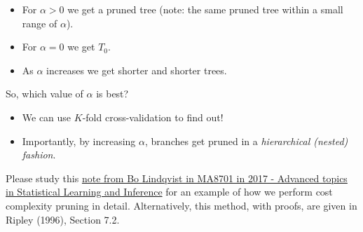 \documentclass[10pt,ignorenonframetext,]{beamer}
\begin{document}
\begin{frame}

\begin{itemize}
\item
  For \(\alpha>0\) we get a pruned tree (note: the same pruned tree
  within a small range of \(\alpha\)).
\item
  For \(\alpha=0\) we get \(T_0\).
\item
  As \(\alpha\) increases we get shorter and shorter trees.
\end{itemize}

So, which value of \(\alpha\) is best?

\begin{itemize}
\item
  We can use \(K\)-fold cross-validation to find out!
\item
  Importantly, by increasing \(\alpha\), branches get pruned in a
  \emph{hierarchical (nested) fashion}.
\end{itemize}

Please study this
\href{https://www.math.ntnu.no/emner/TMA4268/2018v/notes/CART1MA87012017BoLindqvist.pdf}{note
from Bo Lindqvist in MA8701 in 2017 - Advanced topics in Statistical
Learning and Inference} for an example of how we perform cost complexity
pruning in detail. Alternatively, this method, with proofs, are given in
Ripley (1996), Section 7.2.

\end{frame}
\end{document}
